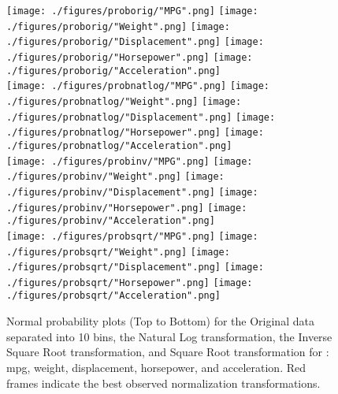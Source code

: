 \documentclass[10pt, conference, compsocconf]{IEEEtran}
\begin{document}
\begin{figure*}[htb]
	\vspace{-2mm}
	\centering
	\texttt{[image: ./figures/proborig/"MPG".png]}
	\texttt{[image: ./figures/proborig/"Weight".png]}
	\texttt{[image: ./figures/proborig/"Displacement".png]}
	\texttt{[image: ./figures/proborig/"Horsepower".png]}
	\texttt{[image: ./figures/proborig/"Acceleration".png]}\\
	
	\centering
	\texttt{[image: ./figures/probnatlog/"MPG".png]}
	\texttt{[image: ./figures/probnatlog/"Weight".png]}
	\texttt{[image: ./figures/probnatlog/"Displacement".png]}
	\texttt{[image: ./figures/probnatlog/"Horsepower".png]}
	\texttt{[image: ./figures/probnatlog/"Acceleration".png]}\\

	\centering
	\texttt{[image: ./figures/probinv/"MPG".png]}
	\texttt{[image: ./figures/probinv/"Weight".png]}
	\texttt{[image: ./figures/probinv/"Displacement".png]}
	\texttt{[image: ./figures/probinv/"Horsepower".png]}
	\texttt{[image: ./figures/probinv/"Acceleration".png]}\\
	
	\centering
	\texttt{[image: ./figures/probsqrt/"MPG".png]}
	\texttt{[image: ./figures/probsqrt/"Weight".png]}
	\texttt{[image: ./figures/probsqrt/"Displacement".png]}
	\texttt{[image: ./figures/probsqrt/"Horsepower".png]}
	\texttt{[image: ./figures/probsqrt/"Acceleration".png]}\\
	
	
	\caption{Normal probability plots (Top to Bottom) for the Original data separated into 10 bins, the Natural Log transformation, the Inverse Square Root transformation, and Square Root transformation for : mpg, weight, displacement, horsepower, and acceleration. Red frames indicate the best observed normalization transformations.}
\label{fig6}
\end{figure*}
\end{document}
